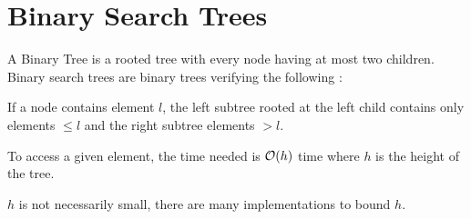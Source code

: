 \documentclass{cours}
\begin{document}
\section{Binary Search Trees}
\begin{definition}
    A Binary Tree is a rooted tree with every node having at most two children. Binary search trees are binary trees verifying the following : 
    \begin{center}
        If a node contains element $l$, the left subtree rooted at the left child contains only elements $\leq l$ and the right subtree elements $> l$.
    \end{center}
\end{definition}

\begin{proposition}
    To access a given element, the time needed is $\mathcal{O}(h)$ time where $h$ is the height of the tree.
\end{proposition}
$h$ is not necessarily small, there are many implementations to bound $h$.
\end{document}
